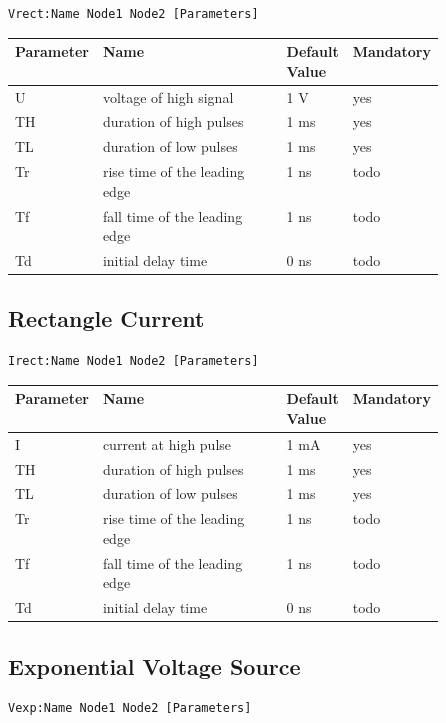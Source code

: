 \begin{verbatim}
Vrect:Name Node1 Node2 [Parameters]
\end{verbatim}


\begin{tabular}{|l|p{0.5\linewidth}|l|l|}
\hline
Parameter & Name & Default Value & Mandatory \\
\hline
U & voltage of high signal & 1 V & yes \\
TH & duration of high pulses & 1 ms & yes \\
TL & duration of low pulses & 1 ms & yes \\
Tr & rise time of the leading edge & 1 ns & todo \\
Tf & fall time of the leading edge & 1 ns & todo \\
Td & initial delay time & 0 ns & todo \\
\hline
\end{tabular}



\subsection{Rectangle Current}

\begin{verbatim}
Irect:Name Node1 Node2 [Parameters]
\end{verbatim}


\begin{tabular}{|l|p{0.5\linewidth}|l|l|}
\hline
Parameter & Name & Default Value & Mandatory \\
\hline
I & current at high pulse & 1 mA & yes \\
TH & duration of high pulses & 1 ms & yes \\
TL & duration of low pulses & 1 ms & yes \\
Tr & rise time of the leading edge & 1 ns & todo \\
Tf & fall time of the leading edge & 1 ns & todo \\
Td & initial delay time & 0 ns & todo \\
\hline
\end{tabular}


\subsection{Exponential Voltage Source}

\begin{verbatim}
Vexp:Name Node1 Node2 [Parameters]
\end{verbatim}


